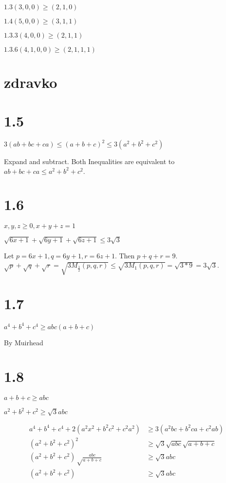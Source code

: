 \documentclass{article}
\begin{document}
$1.3 (3, 0, 0) \ge (2, 1, 0)$

$1.4 (5, 0, 0) \ge (3, 1, 1)$

$1.3.3 (4, 0, 0) \ge (2, 1, 1)$

$1.3.6 (4, 1, 0, 0) \ge (2, 1, 1, 1)$

\section*{zdravko}

\section*{1.5}

$3(ab + bc + ca) \le (a + b + c)^2 \le 3(a^2 + b^2 + c^2)$

Expand and subtract. Both Inequalities are equivalent to $ab + bc + ca \le a^2 + b^2 + c^2$.

\section*{1.6}

$x, y, z \ge 0, x + y + z = 1$

$\sqrt{6x + 1} + \sqrt{6y + 1} + \sqrt{6z + 1} \le 3 \sqrt 3$

Let $p = 6x+1, q = 6y+1, r = 6z+1$. Then $p + q + r = 9$. $\sqrt p + \sqrt q + \sqrt r = \sqrt{3 M_\frac{1}{2} (p, q, r)} \le \sqrt{3 M_1(p, q, r)} = \sqrt{3*9} = 3\sqrt 3$.

\section*{1.7}

$a^4 + b^4 + c^4 \ge abc(a + b + c)$

By Muirhead

\section*{1.8}

$a + b + c \ge abc$

$a^2 + b^2 + c^2 \ge \sqrt{3} abc$

\begin{align*}
a^4 + b^4 + c^4 + 2(a^2x^2 + b^2c^2 + c^2a^2) &\ge 3(a^2bc + b^2ca + c^2ab) \\
(a^2 + b^2 + c^2)^2 &\ge \sqrt 3 \sqrt{abc} \sqrt{a + b + c} \\
(a^2 + b^2 + c^2)\sqrt\frac{abc}{a + b + c} &\ge \sqrt 3 abc \\
(a^2 + b^2 + c^2) &\ge \sqrt 3 abc
\end{align*}
\end{document}
